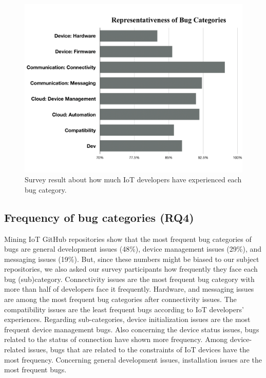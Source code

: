  \begin{figure}%
  \centering
   \includegraphics[width=\linewidth]{imgs/bugRep}
  \caption{Survey result about how much IoT developers have experienced each bug category.}
  \label{fig:bugRep}
\end{figure}

\subsection{Frequency of bug categories (RQ4)}
Mining IoT GitHub repositories show that the most frequent bug categories of bugs are general development issues (48\%), device management issues (29\%), and messaging issues (19\%). But, since these numbers might be biased to our subject repositories, we also asked our survey participants how frequently they face each bug (sub)category. Connectivity issues are the most frequent bug category with more than half of developers face it frequently. Hardware, and messaging issues are among the most frequent bug categories after connectivity issues. 
The compatibility issues are the least frequent bugs according to IoT developers' experiences. Regarding sub-categories, device initialization issues are the most frequent device management bugs. Also concerning the device status issues, bugs related to the status of connection have shown more frequency. Among device-related issues, bugs that are related to the constraints of IoT devices have the most frequency. Concerning general development issues, installation issues are the most frequent bugs. 

